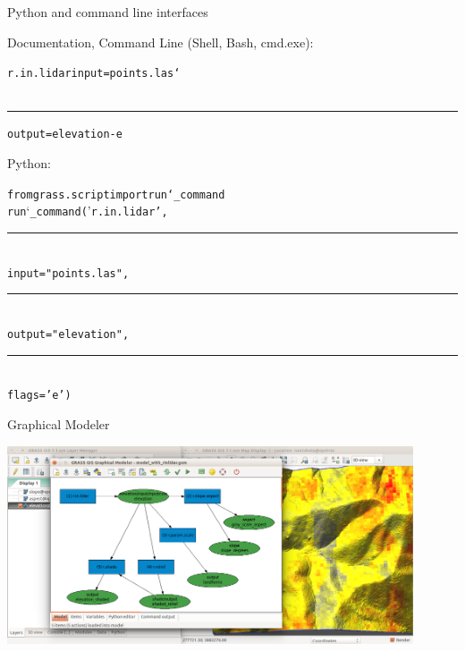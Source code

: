 \documentclass[xcolor={dvipsnames,usenames},beamer,aspectratio=43]{beamer}
\begin{document}
\begin{frame}{Python and command line interfaces}


\Large

Documentation, Command Line (Shell, Bash, cmd.exe):

\LARGE

\begin{alltt}
\textcolor{mod}{r.in.lidar} \textcolor{opt}{input}=\textcolor{txt}{points.las} \textcolor{bash}{\char`\\}
\\%
\newlength{\shindent}
\settowidth{\shindent}{r.in.lidar~}
\rule{\shindent}{0pt}%
\textcolor{opt}{output}=\textcolor{txt}{elevation} -\textcolor{flg}{e}
\end{alltt}

\Large

Python:


\LARGE

\begin{alltt}
\textcolor{import}{from grass.script import run\char`_command}
\\
run\char`_command('\textcolor{mod}{r.in.lidar}',
%
\newlength{\pyindent}%
\settowidth{\pyindent}{run\_command(}%
\\%
\rule{\pyindent}{0pt}\,%
\textcolor{opt}{input}="\textcolor{txt}{points.las}",
\\%
\rule{\pyindent}{0pt}\,%
\textcolor{opt}{output}="\textcolor{txt}{elevation}",
\\%
\rule{\pyindent}{0pt}\,%
flags='\textcolor{flg}{e}')
\end{alltt}

\end{frame}


\begin{frame}{Graphical Modeler}

\begin{center}
  \includegraphics[width=0.9\textwidth]{grass/modeler}
\end{center}

\end{frame}
\end{document}
